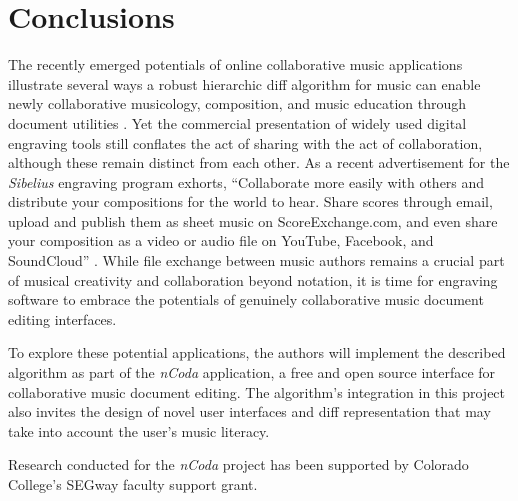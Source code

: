 \documentclass{article}
\begin{document}
\section{Conclusions}
The recently emerged potentials of online collaborative music applications illustrate several ways a robust hierarchic diff algorithm for music can enable newly collaborative musicology, composition, and music education through document utilities \cite{wust2001architectural,Martin:2015pb,McCulloch:2015pd,Flat:aa,Baca:2015xr}.
Yet the commercial presentation of widely used digital engraving tools still conflates the act of sharing with the act of collaboration,
although these remain distinct from each other.
As a recent advertisement for the \emph{Sibelius} engraving program exhorts,
``Collaborate more easily with others and distribute your compositions for the world to hear.
Share scores through email, upload and publish them as sheet music on ScoreExchange.com,
and even share your composition as a video or audio file on YouTube, Facebook, and SoundCloud'' \cite{Avid:to}.
While file exchange between music authors remains a crucial part of musical creativity and collaboration beyond notation,
it is time for engraving software to embrace the potentials of genuinely collaborative music document editing interfaces.

To explore these potential applications, the authors will implement the described algorithm as part of the \emph{nCoda} application,
a free and open source interface for collaborative music document editing.
The algorithm's integration in this project also invites the design of novel user interfaces and diff representation that may take into account the user's music literacy.

%
\begin{acknowledgments}
Research conducted for the \emph{nCoda} project has been supported by Colorado College's SEGway faculty support grant.
\end{acknowledgments}

\balance
\clearpage

\end{document}
